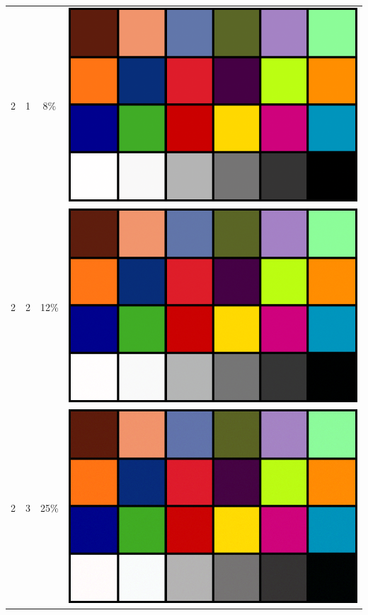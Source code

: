 \documentclass[times, utf8, seminar, numeric]{fer}
\begin{document}
\begin{center}
\begin{longtable}{|c|c|c|c|}
2 & 1 &8\% & \includegraphics[scale=0.3]{../benchmark_results/color_chart/2_components-1_bits.png} \\
2 & 2 &12\% & \includegraphics[scale=0.3]{../benchmark_results/color_chart/2_components-2_bits.png} \\
2 & 3 &25\% & \includegraphics[scale=0.3]{../benchmark_results/color_chart/2_components-3_bits.png} \\

\end{longtable}
\end{center}
\end{document}
